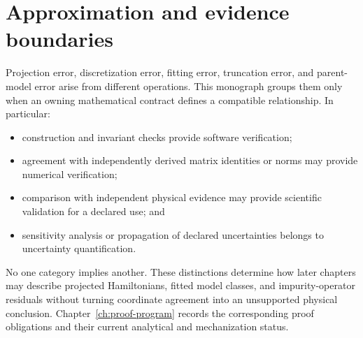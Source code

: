 \section{Approximation and evidence boundaries}


Projection error, discretization error, fitting error, truncation error, and
parent-model error arise from different operations. This monograph groups them
only when an owning mathematical contract defines a compatible relationship.
In particular:

\begin{itemize}
  \item construction and invariant checks provide software verification;
  \item agreement with independently derived matrix identities or norms may
    provide numerical verification;
  \item comparison with independent physical evidence may provide scientific
    validation for a declared use; and
  \item sensitivity analysis or propagation of declared uncertainties belongs
    to uncertainty quantification.
\end{itemize}

No one category implies another. These distinctions determine how later
chapters may describe projected Hamiltonians, fitted model classes, and
impurity-operator residuals without turning coordinate agreement into an
unsupported physical conclusion. Chapter~\ref{ch:proof-program} records the
corresponding proof obligations and their current analytical and mechanization
status.
